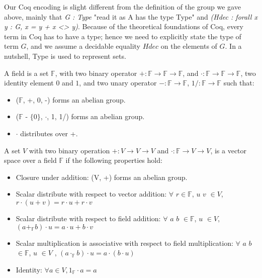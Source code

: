 \noindent
Our Coq encoding is slight different from the definition of the group we gave above, mainly that \textit{G : Type} "read it as A has the type Type" and 
\textit{(Hdec : forall x y : G, {x = y} + {x <> y})}. Because of the theoretical foundations of Coq, every term in Coq has to have a type;
hence we need to explicitly state the type of term $G$, and we assume a decidable equality $Hdec$ on the elements of $G$.  
In a nutshell, Type is used to represent sets. 

\begin{definition}[Field] 
A field  is a set $\mathbb{F}$, with two binary operator $+ : \mathbb{F} \rightarrow \mathbb{F} \rightarrow \mathbb{F}$,  and $\cdot : \mathbb{F} \rightarrow \mathbb{F} \rightarrow \mathbb{F}$, 
two identity element $0$ and $1$, and two unary operator $- : \mathbb{F} \rightarrow \mathbb{F}$, $1/ : \mathbb{F} \rightarrow \mathbb{F}$  such that:
\end{definition} 
 \begin{itemize}
 \item ($\mathbb{F}$, +, 0, -) forms an abelian group.
 \item ($\mathbb{F}$ - $\lbrace 0 \rbrace$, $\cdot$, 1, 1/) forms an abelian group.
 \item $\cdot$ distributes over +.
 \end{itemize}
 
 

\begin{definition}
A set $V$ with two binary operation $+ : V \rightarrow V \rightarrow V$ and $\cdot : \mathbb{F}  \rightarrow V \rightarrow V$, 
is  a vector space over a field $\mathbb{F}$ if the following properties hold:
\end{definition} 
\begin{itemize}
 \item Closure under addition: (V, +) forms an abelian group. 
 \item Scalar  distribute  with respect  to  vector  addition: $\forall$  $r \in \mathbb{F}$, $u$ $v$ $\in V$,  $r \cdot (u + v) = r \cdot u + r \cdot v$
 \item Scalar distribute with respect to field addition: 
                $\forall$  $a$ $b$ $\in \mathbb{F}$, $u$ $\in V$, $(a +_{\mathbb{F}} b) \cdot u = a \cdot u + b \cdot v$
  \item Scalar multiplication is associative with respect to field multiplication:
         $\forall$ $a$ $b$ $\in  \mathbb{F}$, $u$ $\in V$ , $(a \cdot_{\mathbb{F}} b) \cdot u = a \cdot (b \cdot u)$
  \item Identity: $\forall a \in V, 1_{\mathbb{F}} \cdot a = a$

\end{itemize}



